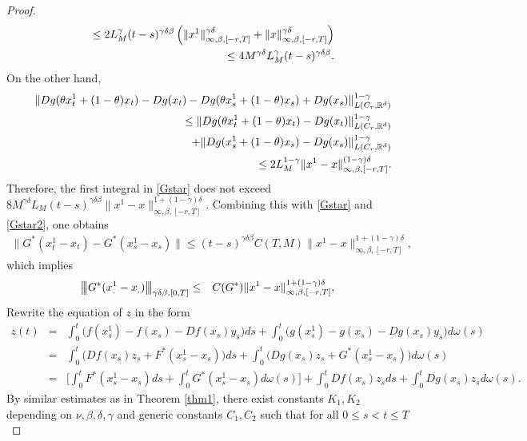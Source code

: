 \documentclass[graybox]{svmult}
\newcommand{\R}{\ensuremath{\mathbb{R}}}
\newcommand{\ltn}{\ensuremath{\left| \! \left| \! \left|}}
\newcommand{\rtn}{\ensuremath{\right| \! \right| \! \right|}}
\begin{document}
\begin{proof}
\begin{eqnarray}
	&&\leq  2L_M^\gamma (t-s)^{\gamma\delta\beta}\left(\|x^1\|^{\gamma\delta}_{\infty,\beta,[-r,T]}+ \|x\|^{\gamma\delta}_{\infty,\beta,[-r,T]}\right)\notag\\
	&&\leq  4M^{\gamma\delta}L_M^\gamma (t-s)^{\gamma\delta\beta}.
	\end{eqnarray} 
	On the other hand,
	\begin{eqnarray}
	&&\|Dg(\theta x^1_t+(1-\theta)x_t) -Dg(x_t)- Dg(\theta x^1_s+(1-\theta)x_s) +Dg(x_s)\|^{1-\gamma}_{L(C_r,\R^d)}\notag     \\
	&&\leq  \|Dg(\theta x^1_t+(1-\theta)x_t) - Dg(x_t)\|_{L(C_r,\R^d)}^{1-\gamma}\notag\\
	&&\quad +\|Dg(x^1_s+(1-\theta)x_s) -Dg(x_s)\|_{L(C_r,\R^d)}^{1-\gamma}\notag	\\
	&& \leq 2L_M^{1-\gamma}\|x^1-x\|^{(1-\gamma)\delta}_{\infty,\beta,[-r,T]}.
	\end{eqnarray}
	Therefore, the first integral in \eqref{Gstar} does not exceed   $8M^{\gamma\delta}L_M(t-s)^{\gamma\delta\beta}\|x^1-x\|^{1+(1-\gamma)\delta}_{\infty,\beta,[-r,T]}$. Combining this with \eqref{Gstar} and \eqref{Gstar2}, one obtains
	\begin{eqnarray*}
		\|G^*(x^1_t-x_t)-G^*(x^1_s-x_s)\|\leq   (t-s)^{\gamma\delta\beta}C(T,M)  \|  x^1-x\|^{1+(1-\gamma)\delta}_{\infty,\beta,[-r,T]},
	\end{eqnarray*}
	which implies 
	\begin{eqnarray}\label{CG*}
	\ltn G^*(x^1_.-x_.)\rtn_{\gamma\delta\beta,[0,T]} &\leq& C(G^*)\|x^1-x\|^{1+(1-\gamma)\delta}_{\infty,\beta,[-r,T]},
	\end{eqnarray}
Rewrite the equation of $z$ in the form
	\begin{eqnarray*}
		z(t)&=& \int_0^t\Big(f(x_s^1)-f(x_s)-Df(x_s)y_s\Big)ds+ \int_0^t\Big(g(x^1_s)-g(x_s)-Dg(x_s)y_s\Big)d\omega(s)\\
		&=& \int_0^t\Big(Df(x_s)z_s +F^*(x_s^1-x_s)\Big)ds + \int_0^t\Big(Dg(x_s)z_s +G^*(x_s^1-x_s)\Big)d\omega(s)\\
		&=& \Big[\int_0^t F^*(x_s^1-x_s) ds + \int_0^t G^*(x^1_s-x_s)d\omega(s)\Big]+\int_0^t Df(x_s)z_s ds + \int_0^t Dg(x_s)z_s d\omega(s).
	\end{eqnarray*}
	By similar estimates as in Theorem \ref{thm1}, there exist constants $K_1,K_2$ depending on $\nu,\beta,\delta,\gamma$ and generic constants $C_1,C_2$ such that for all $0\leq s<t\leq T$ %

\end{proof}
\end{document}
